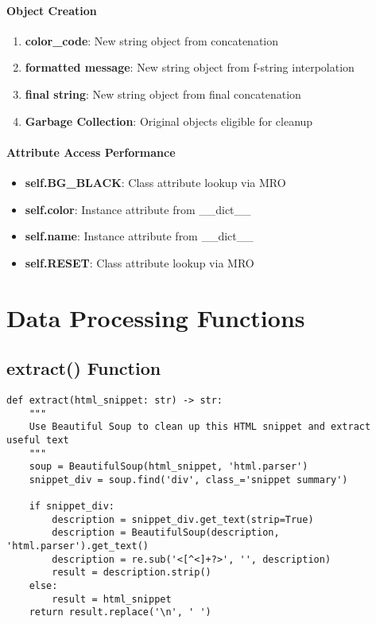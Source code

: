 \paragraph{Object Creation}
\begin{enumerate}
\item \textbf{color\_code}: New string object from concatenation
\item \textbf{formatted message}: New string object from f-string interpolation
\item \textbf{final string}: New string object from final concatenation
\item \textbf{Garbage Collection}: Original objects eligible for cleanup
\end{enumerate}

\paragraph{Attribute Access Performance}
\begin{itemize}
\item \textbf{self.BG\_BLACK}: Class attribute lookup via MRO
\item \textbf{self.color}: Instance attribute from \_\_dict\_\_
\item \textbf{self.name}: Instance attribute from \_\_dict\_\_
\item \textbf{self.RESET}: Class attribute lookup via MRO
\end{itemize}

\section{Data Processing Functions}

\subsection{extract() Function}

\begin{lstlisting}[caption=HTML Processing Function Analysis]
def extract(html_snippet: str) -> str:
    """
    Use Beautiful Soup to clean up this HTML snippet and extract useful text
    """
    soup = BeautifulSoup(html_snippet, 'html.parser')
    snippet_div = soup.find('div', class_='snippet summary')
    
    if snippet_div:
        description = snippet_div.get_text(strip=True)
        description = BeautifulSoup(description, 'html.parser').get_text()
        description = re.sub('<[^<]+?>', '', description)
        result = description.strip()
    else:
        result = html_snippet
    return result.replace('\n', ' ')
\end{lstlisting}

